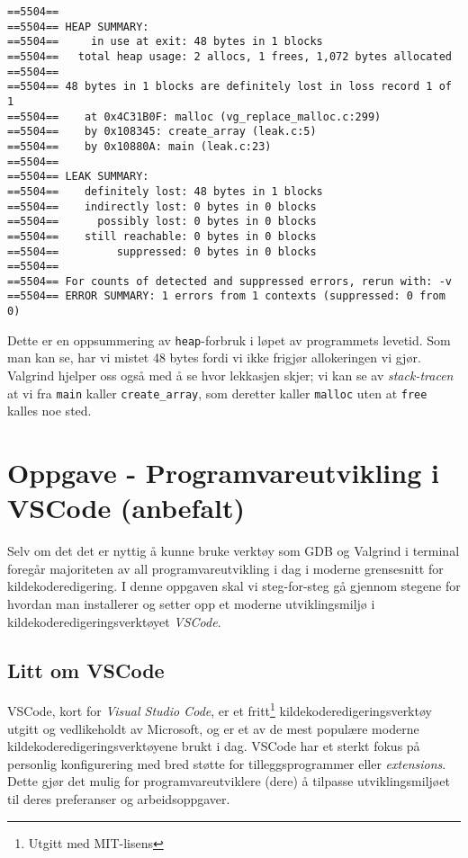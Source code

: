 \begin{lstlisting}[mathescape=true,keywordstyle=\color{black}]
==5504==
==5504== HEAP SUMMARY:
==5504==     in use at exit: 48 bytes in 1 blocks
==5504==   total heap usage: 2 allocs, 1 frees, 1,072 bytes allocated
==5504==
==5504== 48 bytes in 1 blocks are definitely lost in loss record 1 of 1
==5504==    at 0x4C31B0F: malloc (vg_replace_malloc.c:299)
==5504==    by 0x108345: create_array (leak.c:5)
==5504==    by 0x10880A: main (leak.c:23)
==5504==
==5504== LEAK SUMMARY:
==5504==    definitely lost: 48 bytes in 1 blocks
==5504==    indirectly lost: 0 bytes in 0 blocks
==5504==      possibly lost: 0 bytes in 0 blocks
==5504==    still reachable: 0 bytes in 0 blocks
==5504==         suppressed: 0 bytes in 0 blocks
==5504==
==5504== For counts of detected and suppressed errors, rerun with: -v
==5504== ERROR SUMMARY: 1 errors from 1 contexts (suppressed: 0 from 0)

\end{lstlisting}



Dette er en oppsummering av \verb|heap|-forbruk i løpet av programmets levetid. Som man kan se, har vi mistet 48 bytes fordi vi ikke frigjør allokeringen vi gjør. Valgrind hjelper oss også med å se hvor lekkasjen skjer; vi kan se av \textit{stack-tracen} at vi fra \verb|main| kaller \verb|create_array|, som deretter kaller \verb|malloc| uten at \verb|free| kalles noe sted.

\section{Oppgave - Programvareutvikling i VSCode (anbefalt)}

Selv om det det er nyttig å kunne bruke verktøy som GDB og Valgrind i terminal foregår majoriteten av all programvareutvikling i dag i moderne grensesnitt for kildekoderedigering. I denne oppgaven skal vi steg-for-steg gå gjennom stegene for hvordan man installerer og setter opp et moderne utviklingsmiljø i kildekoderedigeringsverktøyet {\it VSCode}. 

\subsection{Litt om VSCode}

VSCode, kort for {\it {Visual Studio Code}}, er et fritt\footnote{Utgitt med MIT-lisens} kildekoderedigeringsverktøy utgitt og vedlikeholdt av Microsoft, og er et av de mest populære moderne kildekoderedigeringsverktøyene brukt i dag. VSCode har et sterkt fokus på personlig konfigurering med bred støtte for tilleggsprogrammer eller {\it extensions}. Dette gjør det mulig for programvareutviklere (dere) å tilpasse utviklingsmiljøet til deres preferanser og arbeidsoppgaver.


